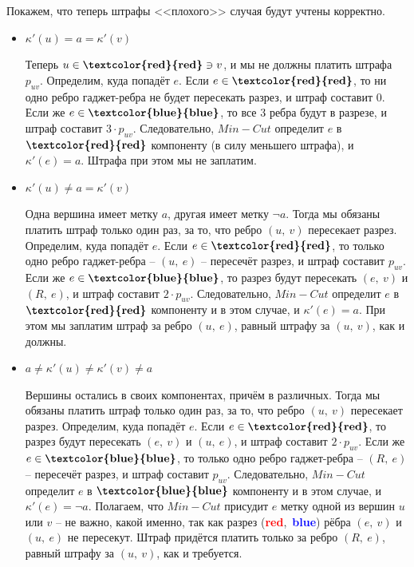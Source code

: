 \documentclass[a4paper,12pt]{article}
\begin{document}
Покажем, что теперь штрафы <<плохого>> случая будут учтены корректно.
\begin{itemize}
    \item $\kappa'(u) = a = \kappa'(v)$
    
    Теперь $u \in \textbf{\textcolor{red}{red}} \ni v$, и мы не должны платить штрафа $p_{uv}$. Определим, куда попадёт $e$. Если $e \in \textbf{\textcolor{red}{red}}$, то ни одно ребро гаджет-ребра не будет пересекать разрез, и штраф составит 0. Если же $e \in \textbf{\textcolor{blue}{blue}}$, то все 3 ребра будут в разрезе, и штраф составит $3 \cdot p_{uv}$. Следовательно, $Min-Cut$ определит $e$ в $\textbf{\textcolor{red}{red}}$ компоненту (в силу меньшего штрафа), и $\kappa'(e) = a$. Штрафа при этом мы не заплатим.
    
    \item $\kappa'(u) \neq a = \kappa'(v)$
    
    Одна вершина имеет метку $a$, другая имеет метку $\neg a$. Тогда мы обязаны платить штраф только один раз, за то, что ребро $(u,\ v)$ пересекает разрез. Определим, куда попадёт $e$. Если $e \in \textbf{\textcolor{red}{red}}$, то только одно ребро гаджет-ребра -- $(u,\ e)$ -- пересечёт разрез, и штраф составит $p_{uv}$. Если же $e \in \textbf{\textcolor{blue}{blue}}$, то разрез будут пересекать $(e,\ v)$ и $(R,\ e)$, и штраф составит $2 \cdot p_{uv}$. Следовательно, $Min-Cut$ определит $e$ в $\textbf{\textcolor{red}{red}}$ компоненту и в этом случае, и $\kappa'(e) = a$. При этом мы заплатим штраф за ребро $(u,\ e)$, равный штрафу за $(u,\ v)$, как и должны.
    
    \item $a \neq \kappa'(u) \neq \kappa'(v) \neq a$
    
    Вершины остались в своих компонентах, причём в различных. Тогда мы обязаны платить штраф только один раз, за то, что ребро $(u,\ v)$ пересекает разрез. Определим, куда попадёт $e$. Если $e \in \textbf{\textcolor{red}{red}}$, то разрез будут пересекать $(e,\ v)$ и $(u,\ e)$, и штраф составит $2 \cdot p_{uv}$. Если же $e \in \textbf{\textcolor{blue}{blue}}$, то только одно ребро гаджет-ребра -- $(R,\ e)$ -- пересечёт разрез, и штраф составит $p_{uv}$. Следовательно, $Min-Cut$ определит $e$ в $\textbf{\textcolor{blue}{blue}}$ компоненту и в этом случае, и $\kappa'(e) = \neg a$. Полагаем, что $Min-Cut$ присудит $e$ метку одной из вершин $u$ или $v$ -- не важно, какой именно, так как разрез (\textbf{\textcolor{red}{red}},\ \textbf{\textcolor{blue}{blue}}) рёбра $(e,\ v)$ и $(u,\ e)$ не пересекут. Штраф придётся платить только за ребро $(R,\ e)$, равный штрафу за $(u,\ v)$, как и требуется.
\end{itemize}
\end{document}
